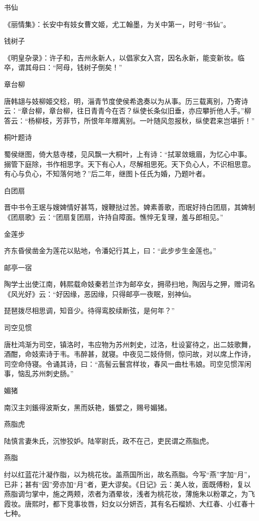 \documentclass[a4paper,12pt,UTF8,twoside]{ctexbook}
\begin{document}
    书仙
    
    《丽情集》：长安中有妓女曹文姬，尤工翰墨，为关中第一，时号“书仙”。
    
    钱树子
    
    《明皇杂录》：许子和，吉州永新人，以倡家女入宫，因名永新，能变新妆。临卒，谓其母曰：“阿母，钱树子倒矣！”
    
    章台柳
    
    唐韩翃与妓柳姬交稔，明，淄青节度使侯希逸奏以为从事。历三载离别，乃寄诗云：“章台柳，章台柳，往日青青今在否？纵使长条似旧垂，亦应攀折他人手。”柳答云：“杨柳枝，芳菲节，所恨年年赠离别。一叶随风忽报秋，纵使君来岂堪折！”
    
    桐叶题诗
    
    蜀侯继图，倚大慈寺楼，见风飘一大桐叶，上有诗：“拭翠敛蛾眉，为忆心中事。搦管下庭除，书作相思字。天下有心人，尽解相思死。天下负心人，不识相思意。有心与负心，不知落何地？”后二年，继图卜任氏为婚，乃题叶者。
    
    白团扇
    
    晋中书令王珉与嫂婢情好甚笃，嫂鞭挞过苦。婢素善歌，而珉好持白团扇，其婢制《团扇歌》云：“团扇复团扇，许持自障面。憔悴无复理，羞与郎相见。”
    
    金莲步
    
    齐东昏侯凿金为莲花以贴地，令潘妃行其上，曰：“此步步生金莲也。”
    
    邮亭一宿
    
    陶学士出使江南，韩熙载命妓秦若兰诈为邮卒女，拥帚扫地，陶因与之狎，赠词名《风光好》云：“好因缘，恶因缘，只得邮亭一夜眠，别神仙。
    
    琵琶拨尽相思调，知音少。待得鸾胶续断弦，是何年？”
    
    司空见惯
    
    唐杜鸿渐为司空，镇洛时，韦应物为苏州刺史，过洛，杜设宴待之，出二妓歌舞，酒酣，命妓索诗于韦。韦醉甚，就寝。中夜见二妓侍侧，惊问故，对以席上作诗，司空命侍寝。令诵其诗，曰：“高髻云鬟宫样妆，春风一曲杜韦娘。司空见惯浑闲事，恼乱苏州刺史肠。”
    
    媚猪
    
    南汉主刘鋹得波斯女，黑而妖艳，鋹嬖之，赐号媚猪。
    
    燕脂虎
    
    陆慎言妻朱氏，沉惨狡妒。陆宰尉氏，政不在己，吏民谓之燕脂虎。
    
    燕脂
    
    纣以红蓝花汁凝作脂，以为桃花妆。盖燕国所出，故名燕脂。今写“燕”字加“月”，已非；甚有“因”旁亦加“月”者，更大谬矣。《日记》云：美人妆，面既傅粉，复以燕脂调匀掌中，施之两颊，浓者为酒晕妆，浅者为桃花妆，薄施朱以粉罩之，为飞霞妆。唐熙时，都下竞事妆唇，妇女以分妍否，其有名石榴娇、大红春、小红春十七种。
    
\end{document}
